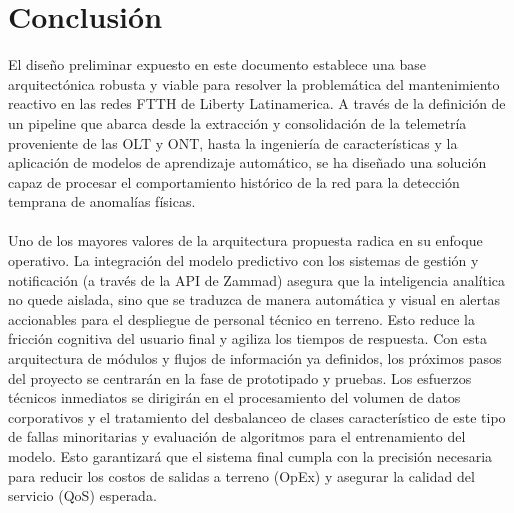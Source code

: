 \documentclass[12pt,a4paper]{article}
\begin{document}
    \section{Conclusión}
\noindent
    El diseño preliminar expuesto en este documento establece una base arquitectónica robusta y viable para resolver la problemática del mantenimiento reactivo en las redes FTTH de Liberty Latinamerica.
    A través de la definición de un pipeline que abarca desde la extracción y consolidación de la telemetría proveniente de las OLT y ONT, 
    hasta la ingeniería de características y la aplicación de modelos de aprendizaje automático, se ha diseñado una solución capaz de procesar el comportamiento
    histórico de la red para la detección temprana de anomalías físicas.\\\\

    \noindent
    Uno de los mayores valores de la arquitectura propuesta radica en su enfoque operativo. La integración del modelo predictivo con los sistemas de gestión y 
    notificación (a través de la API de Zammad) asegura que la inteligencia analítica no quede aislada, sino que se traduzca de manera automática y visual en 
    alertas accionables para el despliegue de personal técnico en terreno. Esto reduce la fricción cognitiva del usuario final y agiliza los tiempos de respuesta.
    Con esta arquitectura de módulos y flujos de información ya definidos, los próximos pasos del proyecto se centrarán en la fase de prototipado y pruebas. 
    Los esfuerzos técnicos inmediatos se dirigirán en el procesamiento del volumen de datos corporativos y el tratamiento del desbalanceo de clases característico de 
    este tipo de fallas minoritarias y evaluación de algoritmos para el entrenamiento del modelo. 
    Esto garantizará que el sistema final cumpla con la precisión necesaria para reducir los costos de salidas a terreno (OpEx) y asegurar la calidad del servicio (QoS) esperada.
\end{document}

